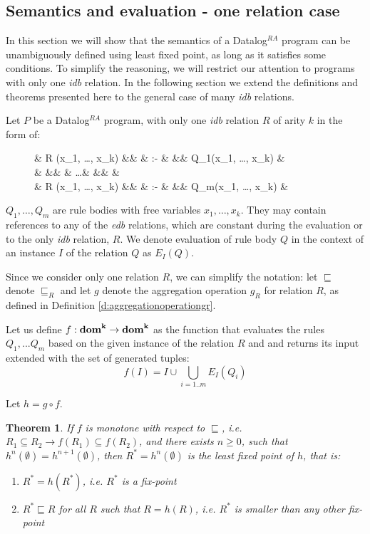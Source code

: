 \documentclass{pracamgr}
\theoremstyle{plain}
\newtheorem{thm}{Theorem}[section]
\theoremstyle{definition}
\theoremstyle{remark}
\newcommand{\datalogra}{Datalog$^{RA}$ }
\newcommand{\narrow}[1]{\begin{changemargin}{2cm}{2cm} #1 \end{changemargin}}
\begin{document}
\subsection{Semantics and evaluation - one relation case}\label{ss:semeval1rel}
In this section we will show that the semantics of a \datalogra program can be unambiguously defined using least fixed point, as long as it satisfies some conditions. To simplify the reasoning, we will restrict our attention to programs with only one \emph{idb} relation. In the following section we extend the definitions and theorems presented here to the general case of many \emph{idb} relations.

Let $P$ be a \datalogra program, with only one \emph{idb} relation $R$ of arity $k$ in the form of:

\begin{figure}[h!]
\narrow{
  \begin{flalign*}
  & \textsc{R} (x_1, \dots, x_k) &&  & :- & && Q_1(x_1, \dots, x_k) & \\
  &  &&  & \dots & && & \\
  & \textsc{R} (x_1, \dots, x_k) &&  & :- & && Q_m(x_1, \dots, x_k) & \\
  \end{flalign*}
}
\end{figure}

$Q_1, \dots, Q_m$ are rule bodies with free variables $x_1, \dots, x_k$. They may contain references to any of the \emph{edb} relations, which are constant during the evaluation or to the only \emph{idb} relation, $R$. We denote evaluation of rule body $Q$ in the context of an instance $I$ of the relation $Q$ as $E_I(Q)$.

Since we consider only one relation $R$, we can simplify the notation: let $\sqsubseteq$ denote $\sqsubseteq_R$ and let $g$ denote the aggregation operation $g_R$ for relation $R$, as defined in Definition \ref{d:aggregationoperationgr}.

Let us define $f: \bf{dom}^k \to \bf{dom}^k$ as the function that evaluates the rules $Q_1, ... Q_m$ based on the given instance of the relation $R$ and and returns its input extended with the set of generated tuples:
$$ f(I) = I \cup \bigcup_{i=1..m} E_I(Q_i) $$

Let $h = g \circ f$. 


\begin{thm}
If $f$ is monotone with respect to $\sqsubseteq$, i.e. $R_1 \subseteq R_2 \rightarrow f(R_1) \subseteq f(R_2)$, and there exists $n \ge 0 $, such that $h^n(\emptyset) = h^{n+1}(\emptyset)$, then $R^* = h^n(\emptyset)$ is the least fixed point of $h$, that is:
\begin{enumerate}
\item $R^* = h(R^*)$, i.e. $R^*$ is a fix-point
\item $R^* \sqsubseteq R$ for all $R$ such that $R = h(R)$, i.e. $R^*$ is smaller than any other fix-point
\end{enumerate}
\end{thm}
\end{document}

